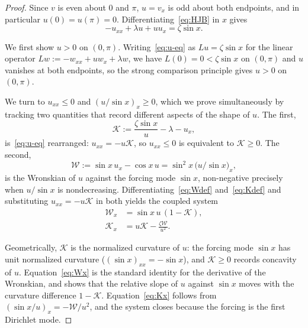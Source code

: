 \documentclass{amsart}
\begin{document}
\begin{proof}
Since $v$ is even about $0$ and $\pi$, $u=v_x$ is odd about both
endpoints, and in particular $u(0)=u(\pi)=0$. Differentiating~\eqref{eq:HJB} in $x$ gives
\begin{equation}\label{eq:u-eq}
-u_{xx}+\lambda u+uu_x=\zeta\sin x.
\end{equation}

We first show $u>0$ on $(0,\pi)$. Writing~\eqref{eq:u-eq} as
$Lu=\zeta\sin x$ for the linear operator
$Lw:=-w_{xx}+uw_x+\lambda w$, we have $L(0)=0<\zeta\sin x$ on $(0,\pi)$
and $u$ vanishes at both endpoints, so the strong comparison principle
gives $u>0$ on $(0,\pi)$.

We turn to $u_{xx}\leq 0$ and $(u/\sin x)_x\geq 0$, which we prove
simultaneously by tracking two quantities that record different aspects
of the shape of $u$.
The first,
\begin{equation}\label{eq:Kdef}
\mathcal K:=\frac{\zeta\sin x}{u}-\lambda-u_x ,
\end{equation}
is~\eqref{eq:u-eq} rearranged: $u_{xx}=-u\mathcal K$, so $u_{xx}\leq 0$ is
equivalent to $\mathcal K\geq 0$. The second,
\begin{equation}\label{eq:Wdef}
\mathcal W:=\sin x\,u_x-\cos x\,u=\sin^2x\,\bigl(u/\sin x\bigr)_x ,
\end{equation}
is the Wronskian of $u$ against the forcing mode $\sin x$, non-negative
precisely when $u/\sin x$ is nondecreasing.
Differentiating~\eqref{eq:Wdef} and~\eqref{eq:Kdef} and substituting
$u_{xx}=-u\mathcal K$ in both yields the coupled system
\begin{subequations}\label{eq:WK}
\begin{align}
\mathcal W_x &= \sin x\,u\,(1-\mathcal K), \label{eq:Wx}\\
\mathcal K_x &= u\mathcal K-\frac{\zeta\mathcal W}{u^2} . \label{eq:Kx}
\end{align}
\end{subequations}

Geometrically, $\mathcal K$ is the normalized curvature of $u$: the forcing
mode $\sin x$ has unit normalized curvature ($(\sin x)_{xx}=-\sin x$),
and $\mathcal K\geq 0$ records concavity of $u$. Equation~\eqref{eq:Wx} is
the standard identity for the derivative of the Wronskian, and shows that the relative slope
of $u$ against $\sin x$ moves with the curvature difference $1-\mathcal K$.
Equation~\eqref{eq:Kx} follows from $(\sin x/u)_x=-\mathcal W/u^2$, and the
system closes because the forcing is the first Dirichlet mode.


\end{proof}
\end{document}
